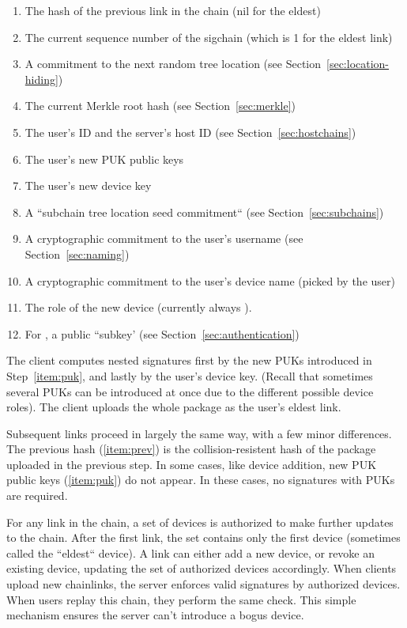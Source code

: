 \begin{enumerate}[label=U.\arabic*]\itemsep0em
    \item \label{item:prev} The hash of the previous link in the chain (nil for the eldest)
    \item The current sequence number of the sigchain (which is 1 for the eldest link)
    \item A commitment to the next random tree location (see Section~\ref{sec:location-hiding})
    \item The current Merkle root hash (see Section~\ref{sec:merkle})
    \item The user's ID and the server's host ID (see Section~\ref{sec:hostchains})
    \item \label{item:puk} The user's new PUK public keys
    \item The user's new device key
    \item A ``subchain tree location seed commitment`` (see Section~\ref{sec:subchains})
      \label{item:stlsc}
    \item A cryptographic commitment to the user's username (see Section~\ref{sec:naming})
       \label{item:name}
    \item A cryptographic commitment to the user's device name (picked by the user)
    \item The role of the new device (currently always \owner ).
    \item For \yubis , a public ``subkey' (see Section~\ref{sec:authentication})
\end{enumerate}

The client computes nested signatures first by the new PUKs introduced in
Step~\ref{item:puk}, and lastly by the user's device key. (Recall that sometimes
several PUKs can be introduced at once due to the different possible device
roles). The client uploads the whole package as the user's eldest link.

Subsequent links proceed in largely the same way, with a few minor differences.
The previous hash (\ref{item:prev}) is the collision-resistent hash of the 
package uploaded in the previous step. In some cases, like device addition,
new PUK public keys (\ref{item:puk}) do not appear. In these cases,
no signatures with PUKs are required.

For any link in the chain, a set of devices is authorized to make further
updates to the chain. After the first link, the set contains only the first
device (sometimes called the ``eldest`` device). A link can either add a new
device, or revoke an existing device, updating the set of authorized devices
accordingly. When clients upload new chainlinks, the server enforces valid
signatures by authorized devices. When users replay this chain, they perform the
same check. This simple mechanism ensures the server can't introduce a bogus
device.

